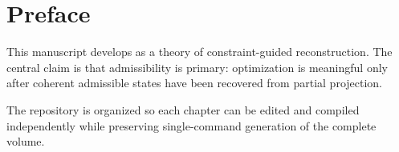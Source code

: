 \chapter*{Preface}

This manuscript develops \CLIO as a theory of constraint-guided reconstruction. The central claim is that admissibility is primary: optimization is meaningful only after coherent admissible states have been recovered from partial projection.

The repository is organized so each chapter can be edited and compiled independently while preserving single-command generation of the complete volume.
